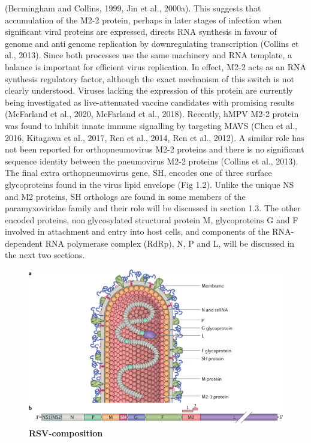 (Bermingham and Collins, 1999, Jin et al., 2000a). This suggests that accumulation of the M2-2 protein, perhaps in later stages of infection when significant viral proteins are expressed, directs RNA synthesis in favour of genome and antigenome replication by downregulating transcription (Collins et al., 2013). Since both processes use the same machinery and RNA template, a balance is important for efficient virus replication. In effect, M2-2 acts as an RNA synthesis regulatory factor, although the exact mechanism of this switch is not clearly understood. Viruses lacking the expression of this protein are currently being investigated as live-attenuated vaccine candidates with promising results (McFarland et al., 2020, McFarland et al., 2018). Recently, hMPV M2-2 protein was found to inhibit innate immune signalling by targeting MAVS (Chen et al., 2016, Kitagawa et al., 2017, Ren et al., 2014, Ren et al., 2012). A similar role has not been reported for orthopneumovirus M2-2 proteins and there is no significant sequence identity between the pneumovirus M2-2 proteins (Collins et al., 2013). The final extra orthopneumovirus gene, SH, encodes one of three surface glycoproteins found in the virus lipid envelope (Fig 1.2). Unlike the unique NS and M2 proteins, SH orthologs are found in some members of the paramyxoviridae family and their role will be discussed in section 1.3. The other encoded proteins, nonglycosylated structural protein M, glycoproteins G and F involved in attachment and entry into host cells, and components of the RNA-dependent RNA polymerase complex (RdRp), N, P and L, will be discussed in the next two sections.

\begin{figure}
    \centering
    \includegraphics[width=1\linewidth]{04. Introduction//Figs/07. RSV-composition.png}
    \caption[RSV-composition]{\textbf{RSV-composition} }
    \label{fig:RSV-composition}
\end{figure}

